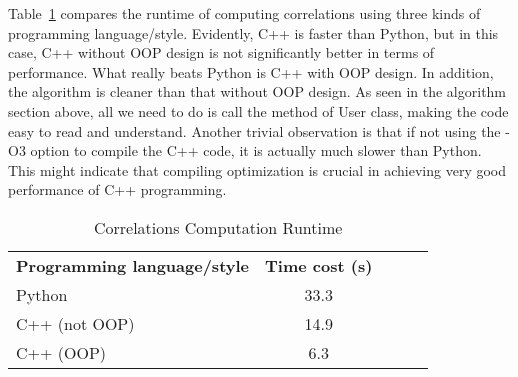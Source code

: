 \documentclass{article}
\begin{document}
\begin{flushleft}
Table~\ref{table:cmpTime} compares the runtime of computing correlations using three kinds of programming language/style. Evidently, C++ is faster than Python, but in this case, C++ without OOP design is not significantly better in terms of performance. What really beats Python is C++ with OOP design. In addition, the algorithm is cleaner than that without OOP design. As seen in the algorithm section above, all we need to do is call the method of User class, making the code easy to read and understand. Another trivial observation is that if not using the -O3 option to compile the C++ code, it is actually much slower than Python. This might indicate that compiling optimization is crucial in achieving very good performance of C++ programming.
%
\begin{table}
\begin{center}
\caption{Correlations Computation Runtime}
\begin{tabular}{|l|c|lll}
\cline{1-2}
\textbf{Programming language/style} & \multicolumn{1}{|l|}{\textbf{Time cost (s)}} &  &  &  \\ \cline{1-2}
Python                              & 33.3                                         &  &  &  \\ \cline{1-2}
C++ (not OOP)                       & 14.9                                         &  &  &  \\ \cline{1-2}
C++ (OOP)                           & 6.3                                          &  &  &  \\ \cline{1-2}
\end{tabular}
\label{table:cmpTime}
\end{center}
\end{table} 




\end{flushleft}
\end{document}
